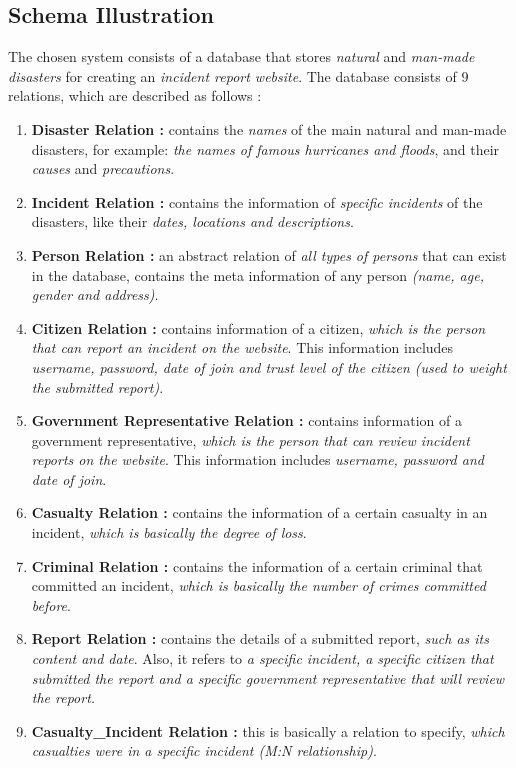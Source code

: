 \subsection{Schema Illustration}
The chosen system consists of a database that stores \emph{natural} and \emph{man-made} \emph{disasters} for creating an \emph{incident report website}. The database consists of $9$ relations, which are described as follows :
\begin{enumerate}
    \item \textbf{Disaster Relation :} contains the \emph{names} of the main natural and man-made disasters, for example: \emph{the names of famous hurricanes and floods}, and their \emph{causes} and \emph{precautions}.
    \item \textbf{Incident Relation :} contains the information of \emph{specific incidents} of the disasters, like their \emph{dates, locations and descriptions}.
    \item \textbf{Person Relation :} an abstract relation of \emph{all types of persons} that can exist in the database, contains the meta information of any person \emph{(name, age, gender and address)}.
    \item \textbf{Citizen Relation :} contains information of a citizen, \emph{which is the person that can report an incident on the website}. This information includes \emph{username, password, date of join and trust level of the citizen (used to weight the submitted report)}.
    \item \textbf{Government Representative Relation :} contains information of a government representative, \emph{which is the person that can review incident reports on the website}. This information includes \emph{username, password and date of join}.
    \item \textbf{Casualty Relation :} contains the information of a certain casualty in an incident, \emph{which is basically the degree of loss}.
    \item \textbf{Criminal Relation :} contains the information of a certain criminal that committed an incident, \emph{which is basically the number of crimes committed before}.
    \item \textbf{Report Relation :} contains the details of a submitted report, \emph{such as its content and date}. Also, it refers to \emph{a specific incident, a specific citizen that submitted the report and a specific government representative that will review the report.}
    \item \textbf{Casualty\_Incident Relation :} this is basically a relation to specify, \emph{which casualties were in a specific incident (M:N relationship)}.
    

\end{enumerate}
